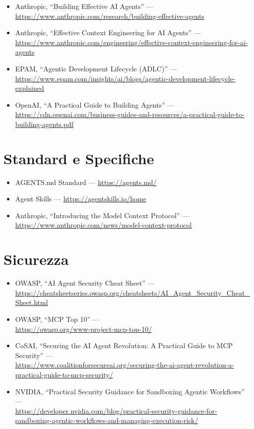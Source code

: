 \begin{itemize}
  \item Anthropic, ``Building Effective AI Agents'' ---\\
    \url{https://www.anthropic.com/research/building-effective-agents}
  \item Anthropic, ``Effective Context Engineering for AI Agents'' ---\\
    \url{https://www.anthropic.com/engineering/effective-context-engineering-for-ai-agents}
  \item EPAM, ``Agentic Development Lifecycle (ADLC)'' ---\\
    \url{https://www.epam.com/insights/ai/blogs/agentic-development-lifecycle-explained}
  \item OpenAI, ``A Practical Guide to Building Agents'' ---\\
    \url{https://cdn.openai.com/business-guides-and-resources/a-practical-guide-to-building-agents.pdf}
\end{itemize}

\section{Standard e Specifiche}

\begin{itemize}
  \item AGENTS.md Standard --- \url{https://agents.md/}
  \item Agent Skills --- \url{https://agentskills.io/home}
  \item Anthropic, ``Introducing the Model Context Protocol'' ---\\
    \url{https://www.anthropic.com/news/model-context-protocol}
\end{itemize}

\section{Sicurezza}

\begin{itemize}
  \item OWASP, ``AI Agent Security Cheat Sheet'' ---\\
    \url{https://cheatsheetseries.owasp.org/cheatsheets/AI_Agent_Security_Cheat_Sheet.html}
  \item OWASP, ``MCP Top 10'' ---\\
    \url{https://owasp.org/www-project-mcp-top-10/}
  \item CoSAI, ``Securing the AI Agent Revolution: A Practical Guide to MCP Security'' ---\\
    \url{https://www.coalitionforsecureai.org/securing-the-ai-agent-revolution-a-practical-guide-to-mcp-security/}
  \item NVIDIA, ``Practical Security Guidance for Sandboxing Agentic Workflows'' ---\\
    \url{https://developer.nvidia.com/blog/practical-security-guidance-for-sandboxing-agentic-workflows-and-managing-execution-risk/}
\end{itemize}

